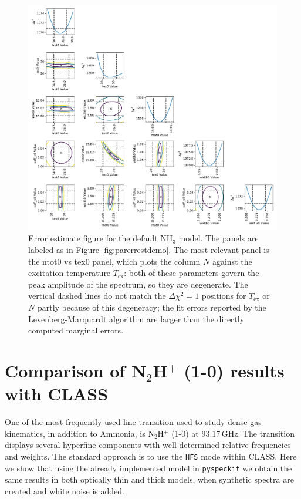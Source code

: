 \documentclass[twocolumn]{aastex62}
\newcommand{\pyspeckit}{\texttt{pyspeckit}\xspace}
\newcommand{\ammonia}{\ensuremath{\mathrm{NH}_3}\xspace}
\begin{document}
\begin{figure}[!htp]
\includegraphics[scale=1,width=7in]{ammonia_LTE_default_error_estimate_demonstration.pdf}
\caption{Error estimate figure for the default \ammonia model.  The panels
are labeled as in Figure \ref{fig:parerrestdemo}.  The most
relevant panel is the ntot0 vs tex0 panel, which plots the column $N$ against
the excitation temperature $T_{\mathrm{ex}}$: both of these parameters govern the peak
amplitude of the spectrum, so they are degenerate.  The vertical dashed lines
do not match the $\Delta\chi^2=1$ positions for $T_{\mathrm{ex}}$ or $N$ partly because
of this degeneracy; the fit errors reported by the Levenberg-Marquardt
algorithm are larger than the directly computed marginal errors. }
\label{fig:nh3parerrestdemo}
\end{figure}


\section{Comparison of N$_2$H$^+$ (1-0) results with CLASS}
\label{appendix:N2Hp}

One of the most frequently used line transition used to study dense gas kinematics,
in addition to Ammonia, is N$_2$H$^+$ (1-0) at 93.17\,GHz.
The transition displays several hyperfine components with well determined
relative frequencies and weights.
The standard approach is to use the \verb+HFS+ mode within
CLASS.
Here we show that using the already implemented model in \pyspeckit
we obtain the same results in both optically thin and thick models, when
synthetic spectra are created and white noise is added.
\end{document}
